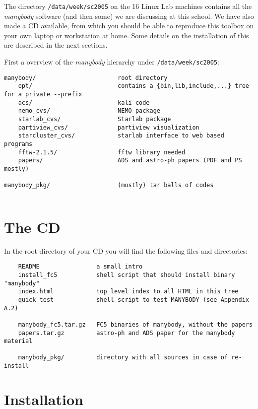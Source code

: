 \begin{itemize}
\begin{itemize}
The directory {\tt /data/week/sc2005} on the 16 Linux Lab machines
contains all the {\it manybody} software (and then some)  
we are discussing at this school. We have
also made a CD available, from which you should be able to reproduce this
toolbox on your own laptop or workstation at home. 
Some details on the installation of this are described in the next sections.

First a overview of the {\it manybody} hierarchy under {\tt /data/week/sc2005}:

\footnotesize
\begin{verbatim}
manybody/                       root directory
    opt/                        contains a {bin,lib,include,...} tree for a private --prefix
    acs/                        kali code
    nemo_cvs/                   NEMO package
    starlab_cvs/                Starlab package
    partiview_cvs/              partiview visualization 
    starcluster_cvs/            starlab interface to web based programs
    fftw-2.1.5/                 fftw library needed 
    papers/                     ADS and astro-ph papers (PDF and PS mostly)

manybody_pkg/                   (mostly) tar balls of codes 
    
\end{verbatim}
\normalsize



\section{The CD}
In the root directory of your CD you will find the following files and directories:

\begin{verbatim}
    README                a small intro
    install_fc5           shell script that should install binary "manybody"
    index.html            top level index to all HTML in this tree
    quick_test            shell script to test MANYBODY (see Appendix A.2)

    manybody_fc5.tar.gz   FC5 binaries of manybody, without the papers
    papers.tar.gz         astro-ph and ADS paper for the manybody material

    manybody_pkg/         directory with all sources in case of re-install
\end{verbatim}

\section{Installation}


\end{itemize}
\end{itemize}
